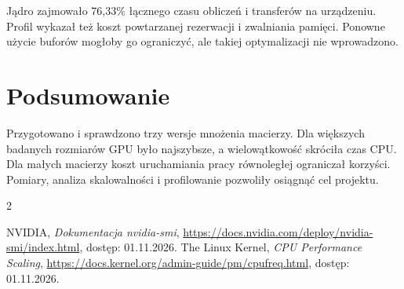 \documentclass[12pt,a4paper]{article}
\begin{document}
Jądro zajmowało 76,33\% łącznego czasu obliczeń i transferów
na urządzeniu. Profil wykazał też koszt powtarzanej rezerwacji
i zwalniania pamięci. Ponowne użycie buforów mogłoby go ograniczyć,
ale takiej optymalizacji nie wprowadzono.

\section{Podsumowanie}

Przygotowano i sprawdzono trzy wersje mnożenia macierzy.
Dla większych badanych rozmiarów GPU było najszybsze,
a wielowątkowość skróciła czas CPU. Dla małych macierzy
koszt uruchamiania pracy równoległej ograniczał korzyści.
Pomiary, analiza skalowalności i profilowanie pozwoliły
osiągnąć cel projektu.

\begin{thebibliography}{2}
\raggedright
{} NVIDIA, \emph{Dokumentacja nvidia-smi},
\url{https://docs.nvidia.com/deploy/nvidia-smi/index.html},
dostęp: 01.11.2026.
 The Linux Kernel, \emph{CPU Performance Scaling},
\url{https://docs.kernel.org/admin-guide/pm/cpufreq.html},
dostęp: 01.11.2026.
\end{thebibliography}
\end{document}
